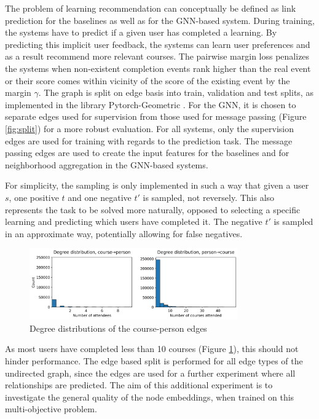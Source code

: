The problem of learning recommendation can conceptually be defined as link prediction for the baselines as well as for the GNN-based system. During training, the systems have to predict if a given user has completed a learning. By predicting this implicit user feedback, the systems can learn user preferences and as a result recommend more relevant courses.  The pairwise margin loss penalizes the systems when non-existent completion events rank higher than the real event or their score comes within vicinity of the score of the existing event by the margin $\gamma$. The graph is split on edge basis into train, validation and test splits, as implemented in the library Pytorch-Geometric \parencite{pyg}. For the GNN, it is chosen to separate edges used for supervision from those used for message passing (Figure \ref{fig:split}) for a more robust evaluation. For all systems, only the supervision edges are used for training with regards to the prediction task. The message passing edges are used to create the input features for the baselines and for neighborhood aggregation in the GNN-based systems. 

For simplicity, the sampling is only implemented in such a way that given a user $s$, one positive $t$ and one negative $t'$ is sampled, not reversely. This also represents the task to be solved more naturally, opposed to selecting a specific learning and predicting which users have completed it. The negative $t'$ is sampled in an approximate way, potentially allowing for false negatives. 
\begin{figure}
    \centering
    \includegraphics[width=0.8\textwidth]{img/degree_distribution_people.png0.0_14890.0_median0.0_people_min0.0_max392.0_med0.0.png}
    \caption{Degree distributions of the course-person edges}
    \label{fig:personcoursedegree}
\end{figure}
As most users have completed less than 10 courses (Figure \ref{fig:personcoursedegree}), this should not hinder performance.
The edge based split is performed for all edge types of the undirected graph, since the edges are used for a further experiment where all relationships are predicted. The aim of this additional experiment is to investigate the general quality of the node embeddings, when trained on this multi-objective problem.

